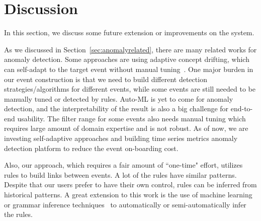 \section{Discussion}

In this section, we discuss some future extension or improvements on the system. 

As we discussed in Section~\ref{sec:anomalyrelated}, there are many related works for anomaly detection. Some approaches are using adaptive concept drifting, which can self-adapt to the target event without manual tuning~\cite{ma2018robust}. One major burden in our event construction is that we need to build different detection strategies/algorithms for different events, while some events are still needed to be manually tuned or detected by rules. Auto-ML is yet to come for anomaly detection, and the interpretability of the result is also a big challenge for end-to-end usability. The filter range for some events also needs manual tuning which requires large amount of domain expertise and is not robust. As of now, we are investing self-adaptive approaches and building time series metrics anomaly detection platform to reduce the event on-boarding cost. 

Also, our approach, which requires a fair amount of ``one-time" effort, utilizes rules to build links between events. A lot of the rules have similar patterns. Despite that our users prefer to have their own control, rules can be inferred from historical patterns. A great extension to this work is the use of machine learning or grammar inference techniques~\cite{wu2019reinam} to automatically or semi-automatically infer the rules.

